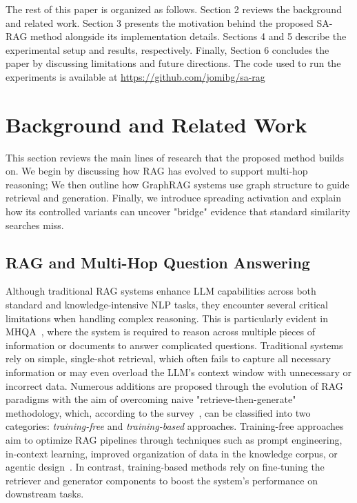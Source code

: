 \documentclass{article}
\begin{document}
The rest of this paper is organized as follows. Section 2 reviews the background and related work. Section 3 presents the motivation behind the proposed SA-RAG method alongside its implementation details. Sections 4 and 5 describe the experimental setup and results, respectively. Finally, Section 6 concludes the paper by discussing limitations and future directions. The code used to run the experiments is available at \url{https://github.com/jomibg/sa-rag}

\section{Background and Related Work}

This section reviews the main lines of research that the proposed method builds on. We begin by discussing how RAG has evolved to support multi-hop reasoning; We then outline how GraphRAG systems use graph structure to guide retrieval and generation. Finally, we introduce spreading activation and explain how its controlled variants can uncover "bridge" evidence that standard similarity searches miss.

\subsection{RAG and Multi-Hop Question Answering}
Although traditional RAG systems enhance LLM capabilities across both standard and knowledge-intensive NLP tasks, they encounter several critical limitations when handling complex reasoning. This is particularly evident in MHQA~\cite{mavi2024multi}, where the system is required to reason across multiple pieces of information or documents to answer complicated questions. Traditional systems rely on simple, single-shot retrieval, which often fails to capture all necessary information or may even overload the LLM’s context window with unnecessary or incorrect data. Numerous additions are proposed through the evolution of RAG paradigms with the aim of overcoming naive  "retrieve-then-generate" methodology, which, according to the survey~\cite{fan2024survey}, can be classified into two categories: \textit{training-free} and \textit{training-based} approaches. Training-free approaches aim to optimize RAG pipelines through techniques such as prompt engineering, in-context learning, improved organization of data in the knowledge corpus, or agentic design~\cite{singh2025agentic}. In contrast, training-based methods rely on fine-tuning the retriever and generator components to boost the system’s performance on downstream tasks.
\end{document}
